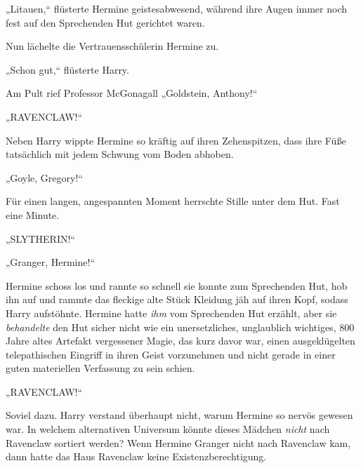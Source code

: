 
„Litauen,“ flüsterte Hermine geistesabwesend, während ihre Augen immer noch fest auf den Sprechenden Hut gerichtet waren.

Nun lächelte die Vertrauensschülerin Hermine zu.

„Schon gut,“ flüsterte Harry.

Am Pult rief Professor McGonagall „Goldstein, Anthony!“

„RAVENCLAW!“

Neben Harry wippte Hermine so kräftig auf ihren Zehenspitzen, dass ihre Füße tatsächlich mit jedem Schwung vom Boden abhoben.

„Goyle, Gregory!“

Für einen langen, angespannten Moment herrschte Stille unter dem Hut. Fast eine Minute.

„SLYTHERIN!“

„Granger, Hermine!“

Hermine schoss los und rannte so schnell sie konnte zum Sprechenden Hut, hob ihn auf und rammte das fleckige alte Stück Kleidung jäh auf ihren Kopf, sodass Harry aufstöhnte. Hermine hatte \emph{ihm} vom Sprechenden Hut erzählt, aber sie \emph{behandelte } den Hut sicher nicht wie ein unersetzliches, unglaublich wichtiges, 800 Jahre altes Artefakt vergessener Magie, das kurz davor war, einen ausgeklügelten telepathischen Eingriff in ihren Geist vorzunehmen und nicht gerade in einer guten materiellen Verfassung zu sein schien.

„RAVENCLAW!“

Soviel dazu. Harry verstand überhaupt nicht, warum Hermine so nervös gewesen war. In welchem alternativen Universum könnte dieses Mädchen \emph{nicht} nach Ravenclaw sortiert werden? Wenn Hermine Granger nicht nach Ravenclaw kam, dann hatte das Haus Ravenclaw keine Existenzberechtigung.

